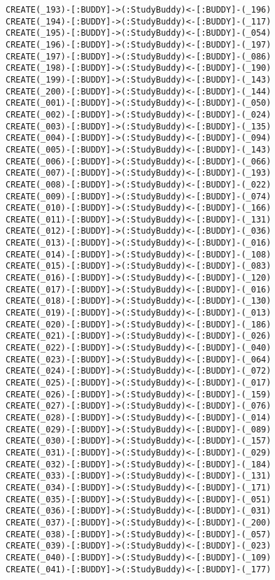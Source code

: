 \begin{lstlisting}
CREATE(_193)-[:BUDDY]->(:StudyBuddy)<-[:BUDDY]-(_196)
CREATE(_194)-[:BUDDY]->(:StudyBuddy)<-[:BUDDY]-(_117)
CREATE(_195)-[:BUDDY]->(:StudyBuddy)<-[:BUDDY]-(_054)
CREATE(_196)-[:BUDDY]->(:StudyBuddy)<-[:BUDDY]-(_197)
CREATE(_197)-[:BUDDY]->(:StudyBuddy)<-[:BUDDY]-(_086)
CREATE(_198)-[:BUDDY]->(:StudyBuddy)<-[:BUDDY]-(_190)
CREATE(_199)-[:BUDDY]->(:StudyBuddy)<-[:BUDDY]-(_143)
CREATE(_200)-[:BUDDY]->(:StudyBuddy)<-[:BUDDY]-(_144)
CREATE(_001)-[:BUDDY]->(:StudyBuddy)<-[:BUDDY]-(_050)
CREATE(_002)-[:BUDDY]->(:StudyBuddy)<-[:BUDDY]-(_024)
CREATE(_003)-[:BUDDY]->(:StudyBuddy)<-[:BUDDY]-(_135)
CREATE(_004)-[:BUDDY]->(:StudyBuddy)<-[:BUDDY]-(_094)
CREATE(_005)-[:BUDDY]->(:StudyBuddy)<-[:BUDDY]-(_143)
CREATE(_006)-[:BUDDY]->(:StudyBuddy)<-[:BUDDY]-(_066)
CREATE(_007)-[:BUDDY]->(:StudyBuddy)<-[:BUDDY]-(_193)
CREATE(_008)-[:BUDDY]->(:StudyBuddy)<-[:BUDDY]-(_022)
CREATE(_009)-[:BUDDY]->(:StudyBuddy)<-[:BUDDY]-(_074)
CREATE(_010)-[:BUDDY]->(:StudyBuddy)<-[:BUDDY]-(_166)
CREATE(_011)-[:BUDDY]->(:StudyBuddy)<-[:BUDDY]-(_131)
CREATE(_012)-[:BUDDY]->(:StudyBuddy)<-[:BUDDY]-(_036)
CREATE(_013)-[:BUDDY]->(:StudyBuddy)<-[:BUDDY]-(_016)
CREATE(_014)-[:BUDDY]->(:StudyBuddy)<-[:BUDDY]-(_108)
CREATE(_015)-[:BUDDY]->(:StudyBuddy)<-[:BUDDY]-(_083)
CREATE(_016)-[:BUDDY]->(:StudyBuddy)<-[:BUDDY]-(_120)
CREATE(_017)-[:BUDDY]->(:StudyBuddy)<-[:BUDDY]-(_016)
CREATE(_018)-[:BUDDY]->(:StudyBuddy)<-[:BUDDY]-(_130)
CREATE(_019)-[:BUDDY]->(:StudyBuddy)<-[:BUDDY]-(_013)
CREATE(_020)-[:BUDDY]->(:StudyBuddy)<-[:BUDDY]-(_186)
CREATE(_021)-[:BUDDY]->(:StudyBuddy)<-[:BUDDY]-(_026)
CREATE(_022)-[:BUDDY]->(:StudyBuddy)<-[:BUDDY]-(_040)
CREATE(_023)-[:BUDDY]->(:StudyBuddy)<-[:BUDDY]-(_064)
CREATE(_024)-[:BUDDY]->(:StudyBuddy)<-[:BUDDY]-(_072)
CREATE(_025)-[:BUDDY]->(:StudyBuddy)<-[:BUDDY]-(_017)
CREATE(_026)-[:BUDDY]->(:StudyBuddy)<-[:BUDDY]-(_159)
CREATE(_027)-[:BUDDY]->(:StudyBuddy)<-[:BUDDY]-(_076)
CREATE(_028)-[:BUDDY]->(:StudyBuddy)<-[:BUDDY]-(_014)
CREATE(_029)-[:BUDDY]->(:StudyBuddy)<-[:BUDDY]-(_089)
CREATE(_030)-[:BUDDY]->(:StudyBuddy)<-[:BUDDY]-(_157)
CREATE(_031)-[:BUDDY]->(:StudyBuddy)<-[:BUDDY]-(_029)
CREATE(_032)-[:BUDDY]->(:StudyBuddy)<-[:BUDDY]-(_184)
CREATE(_033)-[:BUDDY]->(:StudyBuddy)<-[:BUDDY]-(_131)
CREATE(_034)-[:BUDDY]->(:StudyBuddy)<-[:BUDDY]-(_171)
CREATE(_035)-[:BUDDY]->(:StudyBuddy)<-[:BUDDY]-(_051)
CREATE(_036)-[:BUDDY]->(:StudyBuddy)<-[:BUDDY]-(_031)
CREATE(_037)-[:BUDDY]->(:StudyBuddy)<-[:BUDDY]-(_200)
CREATE(_038)-[:BUDDY]->(:StudyBuddy)<-[:BUDDY]-(_057)
CREATE(_039)-[:BUDDY]->(:StudyBuddy)<-[:BUDDY]-(_023)
CREATE(_040)-[:BUDDY]->(:StudyBuddy)<-[:BUDDY]-(_109)
CREATE(_041)-[:BUDDY]->(:StudyBuddy)<-[:BUDDY]-(_177)

\end{lstlisting}
